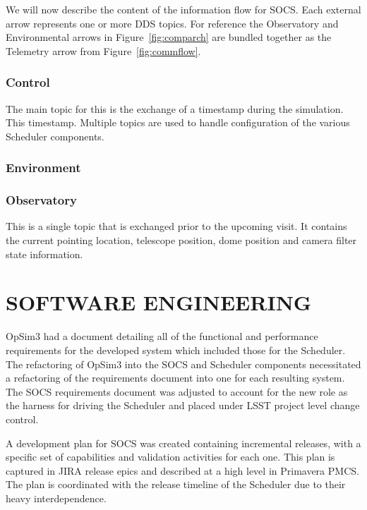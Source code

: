 \documentclass[]{spie}  %
\begin{document}
We will now describe the content of the information flow for SOCS. Each external arrow represents one or more DDS topics. For reference the Observatory and Environmental arrows in Figure~\ref{fig:comparch} are bundled together as the Telemetry arrow from Figure~\ref{fig:commflow}.

\subsubsection{Control}

The main topic for this is the exchange of a timestamp during the simulation. This timestamp. Multiple topics are used to handle configuration of the various Scheduler components.

\subsubsection{Environment}

\subsubsection{Observatory}

This is a single topic that is exchanged prior to the upcoming visit. It contains the current pointing location, telescope position, dome position and camera filter state information.


\section{SOFTWARE ENGINEERING}

OpSim3 had a document detailing all of the functional and performance requirements for the developed system which included those for the Scheduler. The refactoring of OpSim3 into the SOCS and Scheduler components necessitated a refactoring of the requirements document into one for each resulting system. The SOCS requirements document was adjusted to account for the new role as the harness for driving the Scheduler and placed under LSST project level change control.

A development plan for SOCS was created containing incremental releases, with a specific set of capabilities and validation activities for each one. This plan is captured in JIRA\cite{JIRA} release epics and described at a high level in Primavera\cite{Primavera} PMCS\cite{PMCS}. The plan is coordinated with the release timeline of the Scheduler due to their heavy interdependence.
\end{document}
